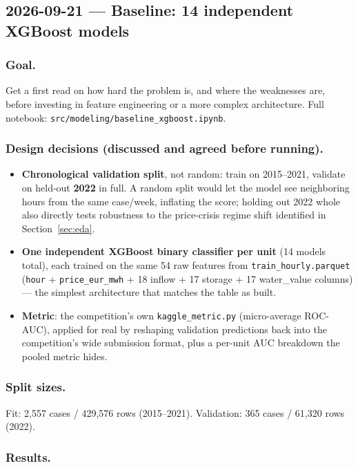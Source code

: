 \subsection{2026-09-21 --- Baseline: 14 independent XGBoost models}
\label{sec:baseline}

\subsubsection*{Goal.} Get a first read on how hard the problem is, and where the weaknesses are,
before investing in feature engineering or a more complex architecture. Full notebook:
\texttt{src/modeling/baseline\_xgboost.ipynb}.

\subsubsection*{Design decisions (discussed and agreed before running).}
\begin{itemize}
  \item \textbf{Chronological validation split}, not random: train on 2015--2021, validate on
    held-out \textbf{2022} in full. A random split would let the model see neighboring hours
    from the same case/week, inflating the score; holding out 2022 whole also directly tests
    robustness to the price-crisis regime shift identified in Section~\ref{sec:eda}.
  \item \textbf{One independent XGBoost binary classifier per unit} (14 models total), each
    trained on the same 54 raw features from \texttt{train\_hourly.parquet}
    (\texttt{hour} + \texttt{price\_eur\_mwh} + 18 inflow + 17 storage + 17 water\_value
    columns) --- the simplest architecture that matches the table as built.
  \item \textbf{Metric}: the competition's own \texttt{kaggle\_metric.py} (micro-average
    ROC-AUC), applied for real by reshaping validation predictions back into the competition's
    wide submission format, plus a per-unit AUC breakdown the pooled metric hides.
\end{itemize}

\subsubsection*{Split sizes.} Fit: 2{,}557 cases / 429{,}576 rows (2015--2021). Validation: 365 cases
/ 61{,}320 rows (2022).

\subsubsection*{Results.}

